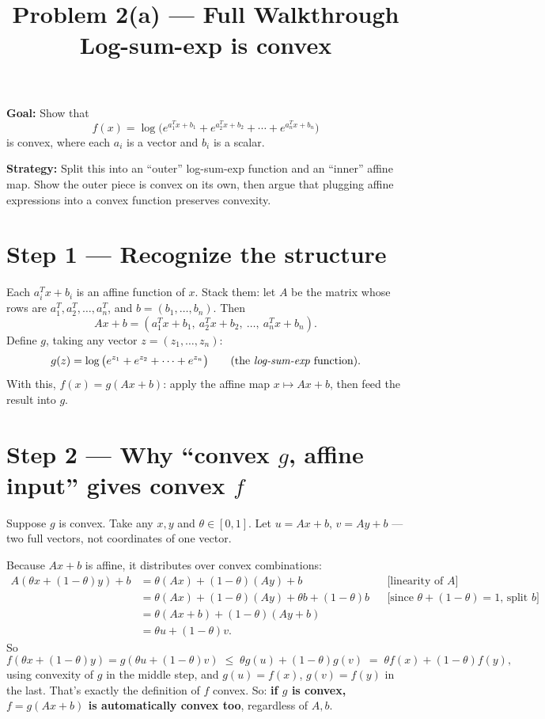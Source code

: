 \documentclass[11pt]{article}
\title{Problem 2(a) --- Full Walkthrough\\ \large Log-sum-exp is convex}
\author{}
\date{}
\begin{document}
\maketitle

\textbf{Goal:} Show that
\[
f(x) = \log\Big( e^{a_1^Tx+b_1} + e^{a_2^Tx+b_2} + \cdots + e^{a_n^Tx+b_n} \Big)
\]
is convex, where each $a_i$ is a vector and $b_i$ is a scalar.

\textbf{Strategy:} Split this into an ``outer'' log-sum-exp function and an ``inner'' affine map. Show the outer piece is convex on its own, then argue that plugging affine expressions into a convex function preserves convexity.

\section*{Step 1 --- Recognize the structure}

Each $a_i^Tx+b_i$ is an affine function of $x$. Stack them: let $A$ be the matrix whose rows are $a_1^T, a_2^T, \dots, a_n^T$, and $b=(b_1,\dots,b_n)$. Then
\[
Ax+b = (a_1^Tx+b_1,\ a_2^Tx+b_2,\ \dots,\ a_n^Tx+b_n).
\]
Define $g$, taking any vector $z=(z_1,\dots,z_n)$:
\[
g(z) = \log\big(e^{z_1}+e^{z_2}+\cdots+e^{z_n}\big) \qquad \text{(the \emph{log-sum-exp} function)}.
\]
With this, $f(x) = g(Ax+b)$: apply the affine map $x\mapsto Ax+b$, then feed the result into $g$.

\section*{Step 2 --- Why ``convex $g$, affine input'' gives convex $f$}

Suppose $g$ is convex. Take any $x,y$ and $\theta\in[0,1]$. Let $u=Ax+b$, $v=Ay+b$ --- two full vectors, not coordinates of one vector.

Because $Ax+b$ is affine, it distributes over convex combinations:
\begin{align*}
A(\theta x+(1-\theta)y)+b
  &= \theta(Ax)+(1-\theta)(Ay)+b &&\text{[linearity of $A$]}\\
  &= \theta(Ax)+(1-\theta)(Ay)+\theta b+(1-\theta) b &&\text{[since $\theta+(1-\theta)=1$, split $b$]}\\
  &= \theta(Ax+b)+(1-\theta)(Ay+b)\\
  &= \theta u+(1-\theta)v.
\end{align*}
So
\[
f(\theta x+(1-\theta)y) = g(\theta u+(1-\theta)v) \;\le\; \theta g(u)+(1-\theta)g(v) \;=\; \theta f(x)+(1-\theta)f(y),
\]
using convexity of $g$ in the middle step, and $g(u)=f(x)$, $g(v)=f(y)$ in the last. That's exactly the definition of $f$ convex. So: \textbf{if $g$ is convex, $f=g(Ax+b)$ is automatically convex too}, regardless of $A,b$.
\end{document}
